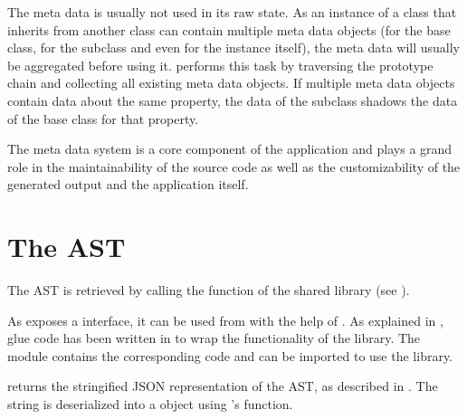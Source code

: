 The meta data is usually not used in its raw state. As an instance of a class that inherits from another class can contain multiple meta data objects (for the base class, for the subclass and even for the instance itself), the meta data will usually be aggregated before using it.  performs this task by traversing the prototype chain and collecting all existing meta data objects. If multiple meta data objects contain data about the same property, the data of the subclass shadows the data of the base class for that property.

The meta data system is a core component of the application and plays a grand role in the maintainability of the source code as well as the customizability of the generated output and the application itself.

\section{The  AST}
\label{sec:CPPAST}

The  AST is retrieved by calling the  function of the  shared library (see ).

As  exposes a  interface, it can be used from  with the help of . As explained in , glue code has been written in  to wrap the functionality of the library. The  module contains the corresponding code and can be imported to use the  library.

 returns the stringified JSON representation of the  AST, as \linebreak described in . The string is deserialized into a  object using 's  function.

